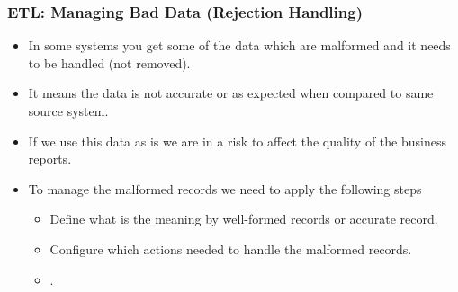 
\begin{frame}
	\frametitle{ETL: Managing Bad Data (Rejection Handling)}
	\begin{itemize}[<+->]
		\item In some systems you get some of the data which are malformed and it needs to be handled (not removed).
		\item It means the data is not accurate or as expected when compared to same source system.
		\item If we use this data as is we are in a risk to affect the quality of the business reports.
		\item To manage the malformed records we need to apply the following steps
		\begin{itemize}[<+->]
			\item  Define what is the meaning by well-formed records or accurate record.
			\item  Configure which actions needed to handle the malformed records.
			\item  {}.

		\end{itemize}
	\end{itemize}
\end{frame}

